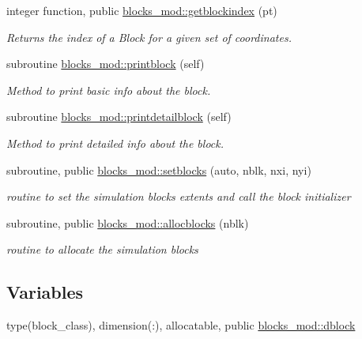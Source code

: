 \begin{DoxyCompactItemize}
integer function, public \mbox{\hyperlink{namespaceblocks__mod_a62e8fb0d6b2535b4499c7a4d848c24ba}{blocks\+\_\+mod\+::getblockindex}} (pt)
\begin{DoxyCompactList}\small\item\em Returns the index of a Block for a given set of coordinates. \end{DoxyCompactList}\item 
subroutine \mbox{\hyperlink{namespaceblocks__mod_a6eab8b323cb15dcecb5c6b0c31b4e246}{blocks\+\_\+mod\+::printblock}} (self)
\begin{DoxyCompactList}\small\item\em Method to print basic info about the block. \end{DoxyCompactList}\item 
subroutine \mbox{\hyperlink{namespaceblocks__mod_a10f356706988c45a255922fe70851488}{blocks\+\_\+mod\+::printdetailblock}} (self)
\begin{DoxyCompactList}\small\item\em Method to print detailed info about the block. \end{DoxyCompactList}\item 
subroutine, public \mbox{\hyperlink{namespaceblocks__mod_a8f5a5d9e6cfd16cfd1b179092a204696}{blocks\+\_\+mod\+::setblocks}} (auto, nblk, nxi, nyi)
\begin{DoxyCompactList}\small\item\em routine to set the simulation blocks extents and call the block initializer \end{DoxyCompactList}\item 
subroutine, public \mbox{\hyperlink{namespaceblocks__mod_a639beb0fee2290d46353f4b4702d6711}{blocks\+\_\+mod\+::allocblocks}} (nblk)
\begin{DoxyCompactList}\small\item\em routine to allocate the simulation blocks \end{DoxyCompactList}\end{DoxyCompactItemize}
\subsection*{Variables}
\begin{DoxyCompactItemize}
\item 
type(block\+\_\+class), dimension(\+:), allocatable, public \mbox{\hyperlink{namespaceblocks__mod_ac8ad6e3cf7a812f95dadb592336aca50}{blocks\+\_\+mod\+::dblock}}
\end{DoxyCompactItemize}
